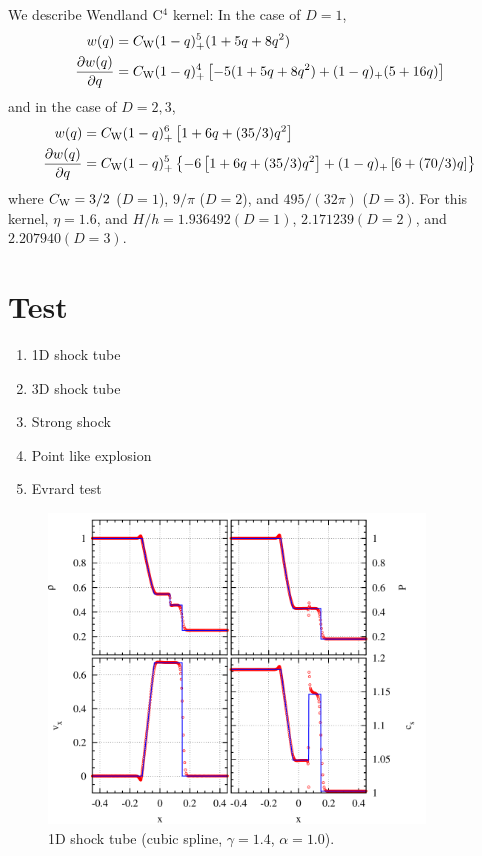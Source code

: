 \documentclass[fleqn,dvipdfmx]{article}
\begin{document}
We describe Wendland C$^4$ kernel: In the case of $D = 1$,
\begin{align}
  w(q) &= C_{\rm W} (1-q)_+^5 (1+5q+8q^2) \\
  \frac{\partial w(q)}{\partial q} &= C_{\rm W} (1-q)_+^4 \left[
    -5(1+5q+8q^2) + (1-q)_+ (5+16q) \right]
\end{align}
and in the case of $D = 2, 3$,
\begin{align}
  w(q) &= C_{\rm W} (1-q)_+^6 \left[ 1+6q+(35/3)q^2 \right] \\
  \frac{\partial w(q)}{\partial q} &= C_{\rm W} (1-q)_+^5 \left\{-6
  \left[ 1+6q+(35/3)q^2 \right] + (1-q)_+ \left[ 6+(70/3)q \right]
  \right\}
\end{align}
where $C_{\rm W}=3/2$ ($D=1$), $9/\pi$ ($D=2$), and $495/(32\pi)$
($D=3$). For this kernel, $\eta=1.6$, and $H/h=1.936492(D=1)$,
$2.171239(D=2)$, and $2.207940(D=3)$.

\section{Test}

\begin{enumerate}
\item 1D shock tube
\item 3D shock tube
\item Strong shock
\item Point like explosion
\item Evrard test
\end{enumerate}

\begin{figure}
  \begin{center}
    \includegraphics[width=10cm,bb=0 0 1020 840]{fig/shock_1d/draw.png}
  \end{center}
  \caption{1D shock tube (cubic spline, $\gamma=1.4$, $\alpha=1.0$).}
\end{figure}
\end{document}
